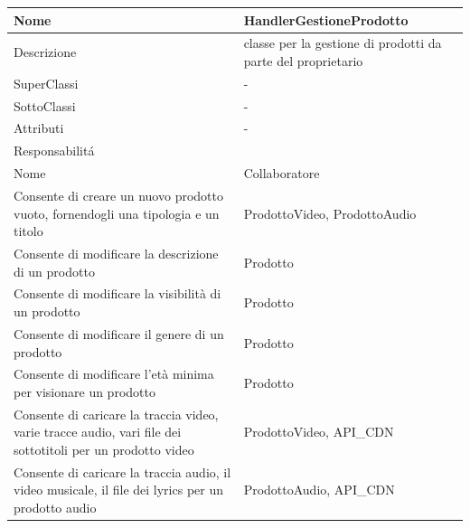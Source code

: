 \begin{center} 
    \begin{longtable}{ |p{3cm}|p{3cm}|p{3cm}|p{3cm}| }
        \hline
        Nome & \multicolumn{3}{|p{9cm}|}{HandlerGestioneProdotto} \\\hline
        Descrizione & \multicolumn{3}{|p{9cm}|}{classe per la gestione di prodotti da parte del proprietario} \\\hline
        SuperClassi & \multicolumn{3}{|p{9cm}|}{-} \\\hline
        SottoClassi & \multicolumn{3}{|p{9cm}|}{-} \\\hline
        Attributi & \multicolumn{3}{|p{9cm}|}{-} \\\hline
        \multicolumn{4}{|p{12cm}|}{Responsabilit\'a} \\\hline %
        \multicolumn{2}{|p{6cm}|}{Nome} & \multicolumn{2}{|p{6cm}|}{Collaboratore} \\\hline
        \multicolumn{2}{|p{6cm}|}{Consente di creare un nuovo prodotto vuoto, fornendogli una tipologia e un titolo} & \multicolumn{2}{|p{6cm}|}{ProdottoVideo, ProdottoAudio} \\\hline
        \multicolumn{2}{|p{6cm}|}{Consente di modificare la descrizione di un prodotto} & \multicolumn{2}{|p{6cm}|}{Prodotto} \\\hline
        \multicolumn{2}{|p{6cm}|}{Consente di modificare la visibilità di un prodotto} & \multicolumn{2}{|p{6cm}|}{Prodotto} \\\hline
        \multicolumn{2}{|p{6cm}|}{Consente di modificare il genere di un prodotto} & \multicolumn{2}{|p{6cm}|}{Prodotto} \\\hline
        \multicolumn{2}{|p{6cm}|}{Consente di modificare l'età minima per visionare un prodotto} & \multicolumn{2}{|p{6cm}|}{Prodotto} \\\hline
        \multicolumn{2}{|p{6cm}|}{Consente di caricare la traccia video, varie tracce audio, vari file dei sottotitoli per un prodotto video} & \multicolumn{2}{|p{6cm}|}{ProdottoVideo, API\_CDN} \\\hline
        \multicolumn{2}{|p{6cm}|}{Consente di caricare la traccia audio, il video musicale, il file dei lyrics per un prodotto audio} & \multicolumn{2}{|p{6cm}|}{ProdottoAudio, API\_CDN} \\\hline
    \end{longtable}
\end{center}

